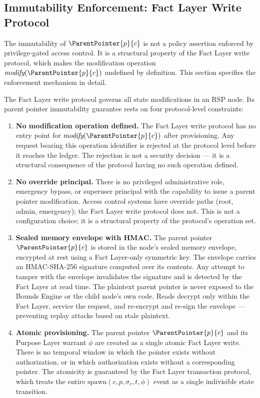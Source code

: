 \subsection{Immutability Enforcement: Fact Layer Write Protocol}
\label{sec:fact-layer-write-protocol}

The immutability of $\ParentPointer{p}{c}$ is not a policy assertion enforced by privilege-gated access control. It is a structural property of the Fact Layer write protocol, which makes the modification operation $\textit{modify}(\ParentPointer{p}{c})$ undefined by definition. This section specifies the enforcement mechanism in detail.

The Fact Layer write protocol governs all state modifications in an RSP node. Its parent pointer immutability guarantee rests on four protocol-level constraints:

\begin{enumerate}
    \item[(W1)] \textbf{No modification operation defined.} The Fact Layer write protocol has no entry point for $\textit{modify}(\ParentPointer{p}{c})$ after provisioning. Any request bearing this operation identifier is rejected at the protocol level before it reaches the ledger. The rejection is not a security decision --- it is a structural consequence of the protocol having no such operation defined.

    \item[(W2)] \textbf{No override principal.} There is no privileged administrative role, emergency bypass, or superuser principal with the capability to issue a parent pointer modification. Access control systems have override paths (root, admin, emergency); the Fact Layer write protocol does not. This is not a configuration choice; it is a structural property of the protocol's operation set.

    \item[(W3)] \textbf{Sealed memory envelope with HMAC.} The parent pointer $\ParentPointer{p}{c}$ is stored in the node's sealed memory envelope, encrypted at rest using a Fact Layer-only symmetric key. The envelope carries an HMAC-SHA-256 signature computed over its contents. Any attempt to tamper with the envelope invalidates the signature and is detected by the Fact Layer at read time. The plaintext parent pointer is never exposed to the Bounds Engine or the child node's own code. Reads decrypt only within the Fact Layer, service the request, and re-encrypt and re-sign the envelope --- preventing replay attacks based on stale plaintext.

    \item[(W4)] \textbf{Atomic provisioning.} The parent pointer $\ParentPointer{p}{c}$ and its Purpose Layer warrant $\phi$ are created as a single atomic Fact Layer write. There is no temporal window in which the pointer exists without authorization, or in which authorization exists without a corresponding pointer. The atomicity is guaranteed by the Fact Layer transaction protocol, which treats the entire $\mathrm{spawn}(c, p, \sigma_c, t, \phi)$ event as a single indivisible state transition.
\end{enumerate}

